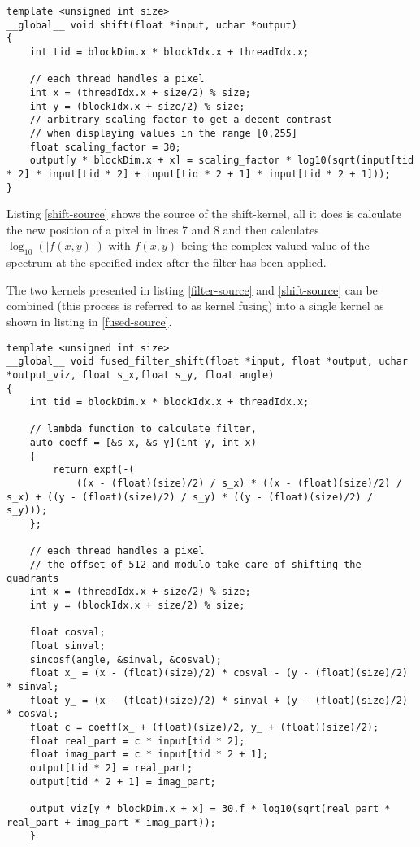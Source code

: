 \documentclass[english,11pt,a4paper,table]{article} %
\begin{document}
\begin{verbatim}
template <unsigned int size>
__global__ void shift(float *input, uchar *output)
{
	int tid = blockDim.x * blockIdx.x + threadIdx.x;
	
	// each thread handles a pixel
	int x = (threadIdx.x + size/2) % size;
	int y = (blockIdx.x + size/2) % size;
	// arbitrary scaling factor to get a decent contrast 
	// when displaying values in the range [0,255]
	float scaling_factor = 30;
	output[y * blockDim.x + x] = scaling_factor * log10(sqrt(input[tid * 2] * input[tid * 2] + input[tid * 2 + 1] * input[tid * 2 + 1]));
}
\end{verbatim}

Listing \ref{shift-source} shows the source of the shift-kernel, all it does is calculate the new position of a pixel in lines 7 and 8 and then calculates $\log_{10}(|f(x,y)|)$ with $f(x,y)$ being the complex-valued value of the spectrum at the specified index after the filter has been applied.

The two kernels presented in listing \ref{filter-source} and \ref{shift-source} can be combined (this process is referred to as kernel fusing) into a single kernel as shown in listing in \ref{fused-source}.

\begin{verbatim}
template <unsigned int size>
__global__ void fused_filter_shift(float *input, float *output, uchar *output_viz, float s_x,float s_y, float angle)
{
	int tid = blockDim.x * blockIdx.x + threadIdx.x;
	
	// lambda function to calculate filter,
	auto coeff = [&s_x, &s_y](int y, int x)
	{
		return expf(-(
			((x - (float)(size)/2) / s_x) * ((x - (float)(size)/2) / s_x) + ((y - (float)(size)/2) / s_y) * ((y - (float)(size)/2) / s_y)));
	};
	
	// each thread handles a pixel
	// the offset of 512 and modulo take care of shifting the quadrants
	int x = (threadIdx.x + size/2) % size;
	int y = (blockIdx.x + size/2) % size;
	
	float cosval;
	float sinval;
	sincosf(angle, &sinval, &cosval);
	float x_ = (x - (float)(size)/2) * cosval - (y - (float)(size)/2) * sinval;
	float y_ = (x - (float)(size)/2) * sinval + (y - (float)(size)/2) * cosval;
	float c = coeff(x_ + (float)(size)/2, y_ + (float)(size)/2);
	float real_part = c * input[tid * 2];
	float imag_part = c * input[tid * 2 + 1];
	output[tid * 2] = real_part;
	output[tid * 2 + 1] = imag_part;
	
	output_viz[y * blockDim.x + x] = 30.f * log10(sqrt(real_part * real_part + imag_part * imag_part));
	}
\end{verbatim}
\end{document}

